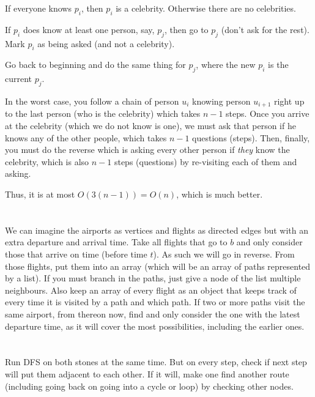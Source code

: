 \documentclass[11pt,letterpaper]{article}
\begin{document}
	If everyone knows $p_i$, then $p_i$ is a celebrity.
	Otherwise there are no celebrities.\newline
	
	If $p_i$ does know at least one person, say, $p_j$, then go to $p_j$ (don't ask for the rest). Mark $p_i$ as being asked (and not a celebrity).\newline
	
	Go back to beginning and do the same thing for $p_j$, where the new $p_i$ is the current $p_j$.\newline
	
	In the worst case, you follow a chain of person $u_i$ knowing person $u_{i+1}$ right up to the last person (who is the celebrity) which takes $n-1$ steps. Once you arrive at the celebrity (which we do not know is one), we must ask that person if he knows any of the other people, which takes $n-1$ questions (steps). Then, finally, you must do the reverse which is asking every other person if \textit{they} know the celebrity, which is also $n-1$ steps (questions) by re-visiting each of them and asking.
	
	Thus, it is at most $O(3(n-1))=O(n)$, which is much better.
	
	\section{}
	We can imagine the airports as vertices and flights as directed edges but with an extra departure and arrival time.
	Take all flights that go to $b$ and only consider those that arrive on time (before time $t$). As such we will go in reverse.
	From those flights, put them into an array (which will be an array of paths represented by a list).
	If you must branch in the paths, just give a node of the list multiple neighbours.
	Also keep an array of every flight as an object that keeps track of every time it is visited by a path and which path.
	If two or more paths visit the same airport, from thereon now, find and only consider the one with the latest departure time, as it will cover the most possibilities, including the earlier ones.
	
	
	\section{}
	Run DFS on both stones at the same time. But on every step, check if next step will put them adjacent to each other. If it will, make one find another route (including going back on going into a cycle or loop) by checking other nodes.
	
\end{document}
